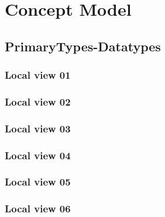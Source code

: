 
\chapter{Concept Model}
\label{chap:lu.uni.lassy.excalibur.group09.spec-CM}




\section{PrimaryTypes-Datatypes}
\subsection{Local view 01}
\label{sec:lu.uni.lassy.excalibur.group09.spec-CM-view-local-PrimaryTypes-Datatypes-01}

\subsection{Local view 02}
\label{sec:lu.uni.lassy.excalibur.group09.spec-CM-view-local-PrimaryTypes-Datatypes-02}

\subsection{Local view 03}
\label{sec:lu.uni.lassy.excalibur.group09.spec-CM-view-local-PrimaryTypes-Datatypes-03}

\subsection{Local view 04}
\label{sec:lu.uni.lassy.excalibur.group09.spec-CM-view-local-PrimaryTypes-Datatypes-04}

\subsection{Local view 05}
\label{sec:lu.uni.lassy.excalibur.group09.spec-CM-view-local-PrimaryTypes-Datatypes-05}

\subsection{Local view 06}
\label{sec:lu.uni.lassy.excalibur.group09.spec-CM-view-local-PrimaryTypes-Datatypes-06}


